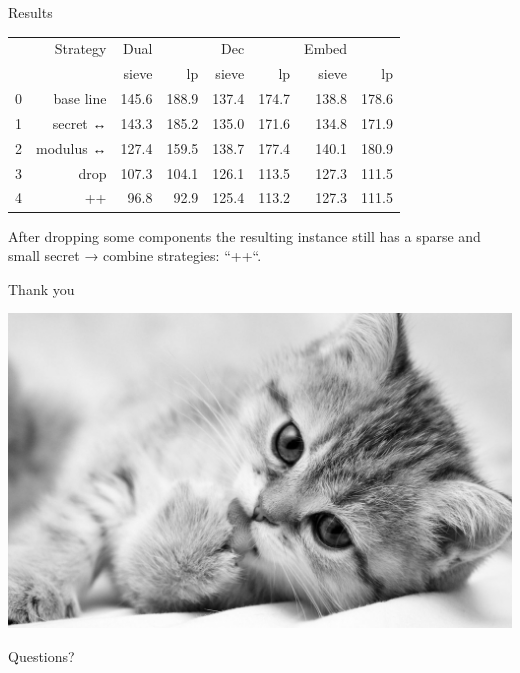 \documentclass[presentation,smaller]{beamer}
\begin{document}
\begin{frame}[label={sec:orgheadline58}]{Results}
\begin{center}
\begin{tabular}{rr|rrrrrr}
 & Strategy & Dual &  & Dec &  & Embed & \\
 &  & sieve & lp & sieve & lp & sieve & lp\\
\hline
0 & base line & 145.6 & 188.9 & 137.4 & 174.7 & 138.8 & 178.6\\
1 & secret ↔ & 143.3 & 185.2 & 135.0 & 171.6 & 134.8 & 171.9\\
2 & modulus ↔ & 127.4 & 159.5 & 138.7 & 177.4 & 140.1 & 180.9\\
3 & drop & 107.3 & 104.1 & 126.1 & 113.5 & 127.3 & 111.5\\
\hline
4 & ++ & 96.8 & 92.9 & 125.4 & 113.2 & 127.3 & 111.5\\
\end{tabular}

\end{center}


After dropping some components the resulting instance still has a sparse and small secret → combine strategies: “++“.
\end{frame}

\begin{frame}[label={sec:orgheadline59}]{Thank you}
\begin{center}
\includegraphics[width=.9\linewidth]{./kitten-01.jpg}

\alert{\Large Questions?}
\end{center}
\end{frame}
\end{document}
